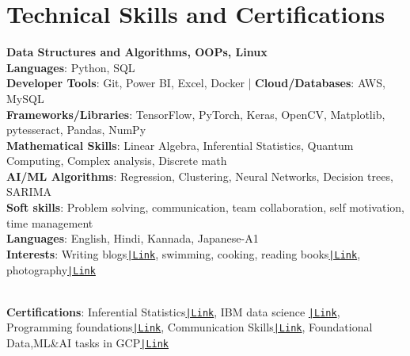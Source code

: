 \documentclass[a4paper,11pt]{article}
\begin{document}
\section{\textbf{Technical Skills and Certifications}}
 \begin{itemize}[leftmargin=0.05in, label={}]
    \small{\item{
     
     \textbf{Data Structures and Algorithms, OOPs, Linux}\\
     \textbf{Languages}{: Python, SQL} \\
     \textbf{Developer Tools}{: Git, Power BI, Excel, Docker | } 
     \textbf{Cloud/Databases}{: AWS, MySQL} \\
     \textbf{Frameworks/Libraries}{: TensorFlow, PyTorch, Keras, OpenCV, Matplotlib, pytesseract, Pandas, NumPy} \\
     
     \textbf{Mathematical Skills}{: Linear Algebra, Inferential Statistics, Quantum Computing, Complex analysis, Discrete math} \\
     \textbf{AI/ML Algorithms}{: Regression, Clustering, Neural Networks, Decision trees, SARIMA} \\
     \textbf{Soft skills}{: Problem solving, communication, team collaboration, self motivation, time management} \\
     \textbf{Languages}{: English, Hindi, Kannada, Japanese-A1}\\
     \textbf{Interests}{: Writing blogs\href{https://daiswap.hashnode.dev/}{\texttt{|Link}}, swimming, cooking, reading books\href{https://www.goodreads.com/daiswap/}{\texttt{|Link}}, photography\href{https://in.pinterest.com/DaiSwap/}{\texttt{|Link}}}
    }}\\
    \textbf{Certifications}{: Inferential Statistics\href{https://coursera.org/share/8cb7c5ff6650d53cf75141d709efcab6}{\texttt{|Link}}, IBM data science \href{https://coursera.org/share/7af997b5be635774bca12c5e9710d8c8}{\texttt{|Link}}, Programming foundations\href{https://coursera.org/share/a82fa7dd92d49103e5f6f50123ca958f}{\texttt{|Link}}, Communication Skills\href{https://coursera.org/share/45b82ff3692d22434ddfc98b67a6f88a}{\texttt{|Link}}, Foundational Data,ML\&AI tasks in GCP\href{https://www.cloudskillsboost.google/public_profiles/59a55ac8-d9c6-439c-b422-6981f048ff1d}{\texttt{|Link}}}
 \end{itemize}
 \vspace{-16pt}
\end{document}
